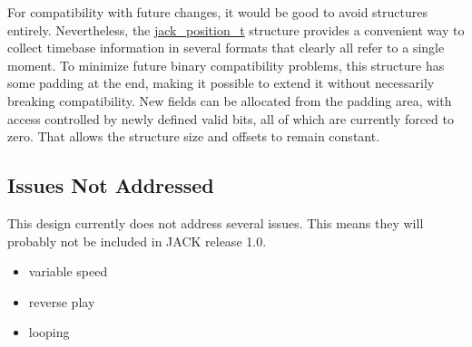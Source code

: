 For compatibility with future changes, it would be good to avoid structures entirely. Nevertheless, the \hyperlink{structjack__position__t}{jack\_\-position\_\-t} structure provides a convenient way to collect timebase information in several formats that clearly all refer to a single moment. To minimize future binary compatibility problems, this structure has some padding at the end, making it possible to extend it without necessarily breaking compatibility. New fields can be allocated from the padding area, with access controlled by newly defined valid bits, all of which are currently forced to zero. That allows the structure size and offsets to remain constant.\hypertarget{transport-design_issues}{}\subsection{Issues Not Addressed}\label{transport-design_issues}
This design currently does not address several issues. This means they will probably not be included in JACK release 1.0.

\begin{itemize}
\item variable speed\item reverse play\item looping \end{itemize}
